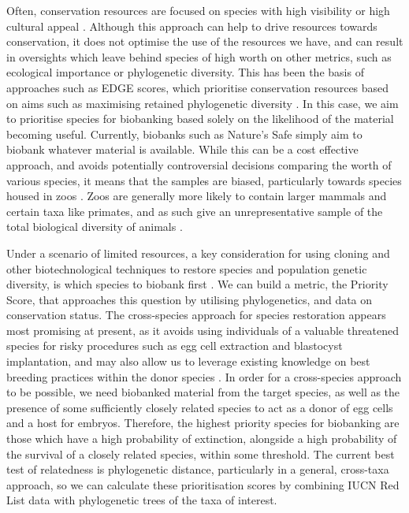 \documentclass[10pt]{article}
\begin{document}
	Often, conservation resources are focused on species with high visibility or
	high cultural appeal \cite{gunnthorsdottirPhysicalAttractivenessAnimal2001}. Although this approach can help to drive resources
	towards conservation, it does not optimise the use of the resources we have, 
	and can result in oversights which leave behind species of high worth on other
	metrics, such as ecological importance or phylogenetic diversity. This has been
	the basis of approaches such as EDGE scores, which prioritise conservation 
	resources based on aims such as maximising retained phylogenetic diversity \cite{isaacMammalsEDGEConservation2007}. In 
	this case, we aim to prioritise species for biobanking based solely on the 
	likelihood of the material becoming useful. Currently, biobanks such as 
	Nature's Safe simply aim to biobank whatever material is available. While this %
	can be a cost effective approach, and avoids potentially controversial 
	decisions comparing the worth of various species, it means that the samples are
	biased, particularly towards species housed in zoos \cite{mooneyValueExSitu2021}. Zoos are generally more
	likely to contain larger mammals and certain taxa like primates, and as such
	give an unrepresentative sample of the total biological diversity of animals \cite{gunnthorsdottirPhysicalAttractivenessAnimal2001}.
	
	Under a scenario of limited resources, a key consideration for using cloning and other
	biotechnological techniques to restore species and population genetic diversity, is
	which species to biobank first \cite{harwoodDevelopingImplementingPrioritisation}. We can build a metric, the Priority Score, that approaches this 
	question by utilising phylogenetics, and data on conservation status. The cross-species approach for species restoration appears most promising at present, as it avoids using
	individuals of a valuable threatened species for risky procedures such as egg cell
	extraction and blastocyst implantation, and may also allow us to leverage existing
	knowledge on best breeding practices within the donor species \cite{wiselyRoadMap21st2015}. In order for a
	cross-species approach to be possible, we need biobanked material from the target
	species, as well as the presence of some sufficiently closely related species to act
	as a donor of egg cells and a host for embryos. Therefore, the highest priority species
	for biobanking are those which have a high probability of extinction, alongside a high
	probability of the survival of a closely related species, within some threshold. The current best test of
	relatedness is phylogenetic distance, particularly in a general, cross-taxa approach, so we can calculate these prioritisation
	scores by combining IUCN Red List data with phylogenetic trees of the taxa of 
	interest.
	
\end{document}
